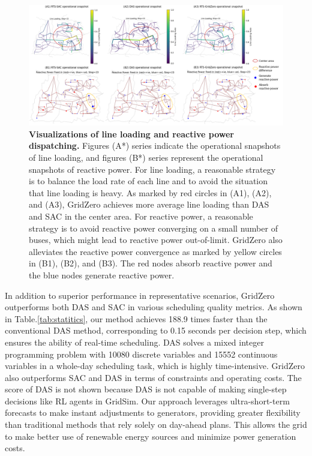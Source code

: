 \begin{figure}[h]
  \centering
  \includegraphics[width=1.0\linewidth]{fig/sac_das_gridzero_line_reactive.png}
  \caption{\textbf{Visualizations of line loading and reactive power dispatching.}
  Figures (A*) series indicate the operational snapshots of line loading, and figures (B*) series represent the operational snapshots of reactive power. For line loading, a reasonable strategy is to balance the load rate of each line and to avoid the situation that line loading is heavy. As marked by red circles in (A1), (A2), and (A3), GridZero achieves more average line loading than DAS and SAC in the center area. For reactive power, a reasonable strategy is to avoid reactive power converging on a small number of buses, which might lead to reactive power out-of-limit. GridZero also alleviates the reactive power convergence as marked by yellow circles in (B1), (B2), and (B3). The red nodes absorb reactive power and the blue nodes generate reactive power. 
  } 
  \label{fig:overflow_reactive}
\end{figure}

In addition to superior performance in representative scenarios, GridZero outperforms both DAS and SAC in various scheduling quality metrics.
As shown in Table.\ref{tab:statitics}, our method achieves 188.9 times faster than the conventional DAS method, corresponding to 0.15 seconds per decision step, which ensures the ability of real-time scheduling. DAS solves a mixed integer programming problem with 10080 discrete variables and 15552 continuous variables in a whole-day scheduling task, which is highly time-intensive. GridZero also outperforms SAC and DAS in terms of constraints and operating costs. 
The score of DAS is not shown because DAS is not capable of making single-step decisions like RL agents in GridSim. 
Our approach leverages ultra-short-term forecasts to make instant adjustments to generators, providing greater flexibility than traditional methods that rely solely on day-ahead plans. This allows the grid to make better use of renewable energy sources and minimize power generation costs.


